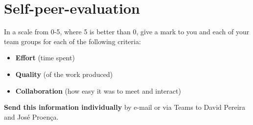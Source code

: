 \documentclass[11pt]{article}
\begin{document}





\section*{Self-peer-evaluation}
\begin{myExercise}
  In a scale from 0-5, where 5 is better than 0, give a mark to you and each of your team groups for each of the following criteria:
  \begin{itemize}
    \item \textbf{Effort} (time spent)
    \item \textbf{Quality} (of the work produced)
    \item \textbf{Collaboration} (how easy it was to meet and interact)
  \end{itemize}
  \textbf{Send this information individually} by e-mail or via Teams to David Pereira and Jos\'{e} Proen\c{c}a.
\end{myExercise}
\end{document}
